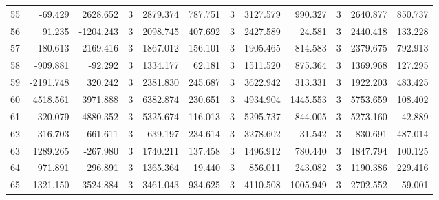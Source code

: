 \begin{table}[ht]
\begin{tabular}{lrrrrrrrrrrr}
55 & -69.429 & 2628.652 & 3 & 2879.374 & 787.751 & 3 & 3127.579 & 990.327 & 3 & 2640.877 & 850.737 \\
56 & 91.235 & -1204.243 & 3 & 2098.745 & 407.692 & 3 & 2427.589 & 24.581 & 3 & 2440.418 & 133.228 \\
57 & 180.613 & 2169.416 & 3 & 1867.012 & 156.101 & 3 & 1905.465 & 814.583 & 3 & 2379.675 & 792.913 \\
58 & -909.881 & -92.292 & 3 & 1334.177 & 62.181 & 3 & 1511.520 & 875.364 & 3 & 1369.968 & 127.295 \\
59 & -2191.748 & 320.242 & 3 & 2381.830 & 245.687 & 3 & 3622.942 & 313.331 & 3 & 1922.203 & 483.425 \\
60 & 4518.561 & 3971.888 & 3 & 6382.874 & 230.651 & 3 & 4934.904 & 1445.553 & 3 & 5753.659 & 108.402 \\
61 & -320.079 & 4880.352 & 3 & 5325.674 & 116.013 & 3 & 5295.737 & 844.005 & 3 & 5273.160 & 42.889 \\
62 & -316.703 & -661.611 & 3 & 639.197 & 234.614 & 3 & 3278.602 & 31.542 & 3 & 830.691 & 487.014 \\
63 & 1289.265 & -267.980 & 3 & 1740.211 & 137.458 & 3 & 1496.912 & 780.440 & 3 & 1847.794 & 100.125 \\
64 & 971.891 & 296.891 & 3 & 1365.364 & 19.440 & 3 & 856.011 & 243.082 & 3 & 1190.386 & 229.416 \\
65 & 1321.150 & 3524.884 & 3 & 3461.043 & 934.625 & 3 & 4110.508 & 1005.949 & 3 & 2702.552 & 59.001 \\
\hline
\end{tabular}
\end{table}
